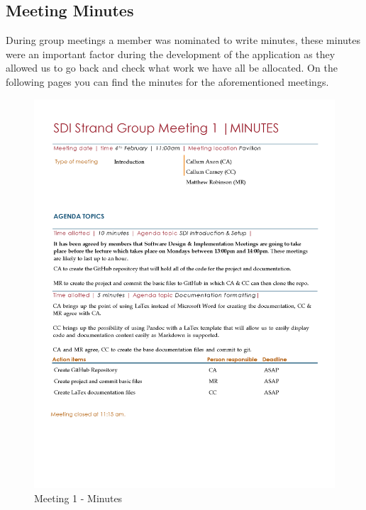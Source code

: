 \documentclass[
  english,
  a4paper,
,tablecaptionabove
]{scrartcl}
\begin{document}
\hypertarget{meeting-minutes}{%
\subsection{Meeting Minutes}\label{meeting-minutes}}

During group meetings a member was nominated to write minutes, these
minutes were an important factor during the development of the
application as they allowed us to go back and check what work we have
all be allocated. On the following pages you can find the minutes for
the aforementioned meetings.

\begin{figure}
\centering
\includegraphics{images/meeting-minutes/meeting-1.png}
\caption{Meeting 1 - Minutes}
\end{figure}
\end{document}
